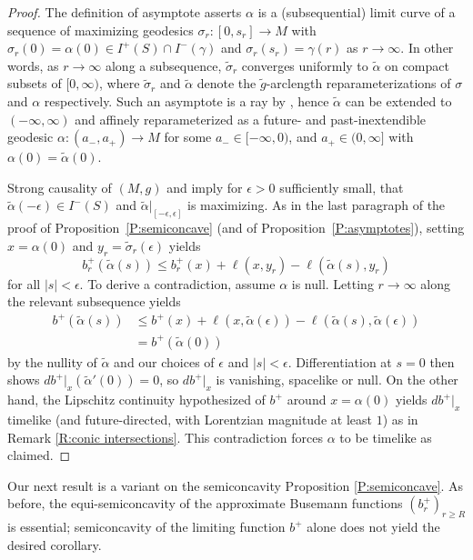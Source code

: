 \documentclass[12pt]{amsart}
\begin{document}
\begin{proof}
The definition of asymptote asserts $\alpha$
is a (subsequential) limit curve of a sequence of maximizing geodesics $\sigma_r:[0,s_r] \longrightarrow M$
with $\sigma_r(0)=\alpha(0) \in I^+(S) \cap I^-(\gamma)$ and $\sigma_r(s_r) = \gamma(r)$ as $r \to \infty$. In other words, as $r\to\infty$ along a %
subsequence, $\tilde \sigma_r$ converges uniformly to $\tilde \alpha$ on compact subsets of $[0,\infty)$,
where $\tilde \sigma_r$ and $\tilde \alpha$ denote the $\tilde g$-arclength reparameterizations 
of $\sigma$ and $\alpha$ respectively.
Such an asymptote is a ray by \cite[Lemma 2.4]{GallowayHorta96}, hence $\tilde \alpha$ can be extended to $(-\infty,\infty)$ and affinely reparameterized as a future- and past-inextendible geodesic $\alpha:(a_-,a_+)\longrightarrow M$ for some $a_- \in [-\infty,0)$,  
and $a_+\in (0,\infty]$  
with $\alpha(0)=\tilde \alpha(0)$.


Strong causality of $(M,g)$ and \cite[Thms.\ 2.9, 2.35]{Min:19} imply for $\epsilon>0$ sufficiently small, that $\tilde \alpha(-\epsilon) \in I^-(S)$ and
$\tilde \alpha|_{[-\epsilon,\epsilon]}$ is maximizing.
As in the last paragraph of the proof of 
Proposition~\ref{P:semiconcave} (and of Proposition~\ref{P:asymptotes}), setting 
$x =\alpha(0)$ and $y_r=\tilde \sigma_r(\epsilon)$ yields
$$b^+_r(\tilde \alpha(s)) 
\le b^+_r(x) + \ell(x,y_r) - \ell(\tilde \alpha(s),y_r)
$$
for all $|s|<\epsilon$.  To derive a contradiction, assume $\alpha$ is null.  Letting $r \to \infty$
along the relevant subsequence yields
\begin{align*}
b^+(\tilde \alpha(s)) 
&\le b^+(x) + \ell(x,\tilde \alpha(\epsilon)) - \ell(\tilde \alpha(s),\tilde \alpha(\epsilon))
\\ &= b^+(\tilde \alpha(0))
\end{align*}
by the nullity of $\tilde \alpha$ and 
our choices of $\epsilon$ and $|s|<\epsilon$.
Differentiation at $s=0$ then shows $db^+|_x(\tilde \alpha'(0))=0$, so $db^+|_x$ is vanishing, spacelike or null.  On the other hand, the Lipschitz continuity hypothesized of $b^+$ around $x=\alpha(0)$
yields $db^+|_x$ timelike (and future-directed, with Lorentzian magnitude at least $1$) as in Remark \ref{R:conic intersections}.  This contradiction forces $\alpha$ to be timelike as claimed.
\end{proof}



Our next result is a variant on the semiconcavity Proposition \ref{P:semiconcave}. As before, the equi-semiconcavity of the approximate Busemann functions $(b^+_r)_{r \ge R}$ is essential; semiconcavity of the limiting function $b^+$ alone does not yield the desired corollary.
\end{document}
